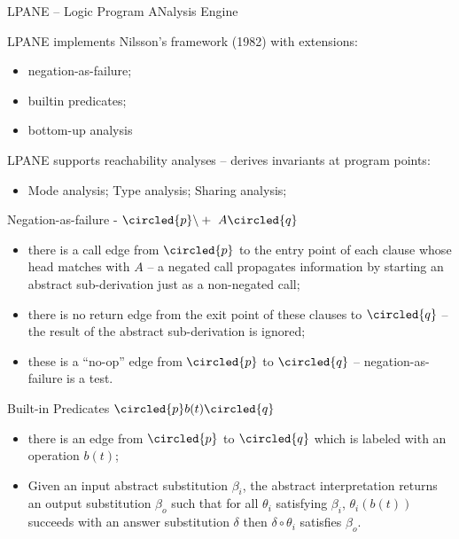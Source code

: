 \documentclass[landscape]{slides}
\newcommand{\point}[1] {\circled{#1}}
\begin{document}
 

 \begin{slide}

 \begin{center}{LPANE -- Logic Program ANalysis Engine}\end{center}

 \end{slide}

 \begin{slide} 

 LPANE implements Nilsson's framework (1982) with extensions: 
 \begin{itemize}
 \item negation-as-failure;
 \item builtin predicates;
 \item bottom-up analysis
 \end{itemize} 

 LPANE supports reachability analyses -- derives invariants at program
 points:
 \begin{itemize} 
 \item Mode analysis; Type analysis; Sharing analysis;
 \end{itemize}

 \end{slide} 

 \begin{slide}
 Negation-as-failure - $\point{p}\backslash+~ A\point{q}$
 \begin{itemize}
 \item there is a call edge from $\point{p}$ to the entry point of each clause whose head matches with $A$ -- a negated call propagates information by
 starting an abstract sub-derivation just as a non-negated call;
 \item there is no return edge from the exit point of these clauses to $\point{q}$ -- the result of the abstract sub-derivation is ignored;
 \item these is a ``no-op'' edge from $\point{p}$ to $\point{q}$ -- negation-as-failure is a test. 
 \end{itemize}
 \end{slide}


 \begin{slide}
 {Built-in Predicates} $\point{p} b(t) \point{q}$
 \begin{itemize}
 \item there is an edge from $\point{p}$ to $\point{q}$ which is labeled with an operation $b(t)$;
 \item  
 Given an input abstract substitution $\beta_{i}$, the abstract
 interpretation returns an output substitution $\beta_{o}$ such that
 for all $\theta_i$ satisfying $\beta_i$, $\theta_i(b(t))$ succeeds with
 an answer substitution $\delta$ then $\delta\circ\theta_i$ satisfies
 $\beta_o$.
 \end{itemize}

 \end{slide}
\end{document}
